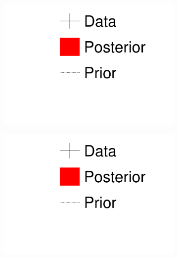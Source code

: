 \begin{figure}[h]
	\begin{subfigure}[t]{0.2\textwidth}
		\includegraphics[width=\textwidth, trim={0mm 90mm 0mm 0mm}, clip,page=1]{figures/mach3/1D_legend_Data_Posterior_Prior}
	\end{subfigure}
	\begin{subfigure}[t]{0.2\textwidth}
		\includegraphics[width=\textwidth, trim={0mm 45mm 0mm 50mm}, clip,page=1]{figures/mach3/1D_legend_Data_Posterior_Prior}
	\end{subfigure}	
	\begin{subfigure}[t]{0.2\textwidth}

\end{subfigure}
\end{figure}
